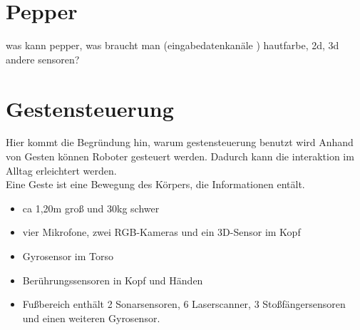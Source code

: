 \documentclass{llncs}
\begin{document}
\section{Pepper}
 was kann pepper, was braucht man (eingabedatenkan\"ale ) hautfarbe, 2d, 3d andere sensoren?

\section{Gestensteuerung}
Hier kommt die Begr\"undung hin, warum gestensteuerung benutzt wird
Anhand von Gesten k\"onnen Roboter gesteuert werden. Dadurch kann die interaktion im Alltag erleichtert werden. \\
Eine Geste ist eine Bewegung des K\"orpers, die Informationen ent\"alt.
\begin{itemize}
\item ca 1,20m gro\ss{} und 30kg schwer
\item vier Mikrofone, zwei RGB-Kameras und ein 3D-Sensor im Kopf
\item Gyrosensor im Torso
\item Ber\"uhrungssensoren in Kopf und H\"anden
\item Fu\ss{}bereich enth\"alt 2 Sonarsensoren, 6 Laserscanner, 3 Sto\ss{}f\"angersensoren und einen weiteren Gyrosensor.
\end{itemize}







\end{document}
